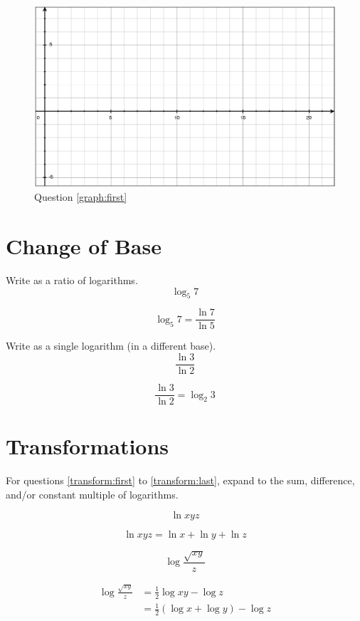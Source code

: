 \documentclass[fleqn,addpoints]{exam}
\begin{document}
\begin{questions}
\begin{solution}[5 cm]
\end{solution}

\ifprintanswers
\else
\begin{figure}[H]
  \centering
  \includegraphics[scale=.6]{graph1.eps}
  \caption*{Question \ref{graph:first}}
\end{figure}
\fi

\pagebreak

\section{Change of Base}
\question[3]
Write as a ratio of logarithms.
\[
  \log_5 7
\]
\begin{solution}[1 cm]
\[
  \log_5 7 = \frac{\ln 7}{\ln 5}
\]
\end{solution}

\question[2]
Write as a single logarithm (in a different base).
\[
  \frac{\ln 3}{\ln 2}
\]
\begin{solution}[1 cm]
\[
  \frac{\ln 3}{\ln 2} = \log_2 3
\]
\end{solution}

\section{Transformations}

For questions \ref{transform:first} to \ref{transform:last}, expand to the sum, difference, and/or constant multiple of
logarithms. 

\question[3]
\label{transform:first}
\[
  \ln xyz
\]
\begin{solution}[3 cm]
\[
  \ln xyz = \ln x + \ln y + \ln z
\]
\end{solution}

\question[7]
\[
  \log \frac{ \sqrt{xy} } { z } 
\]
\begin{solution}[4 cm]
\begin{align*}
  \log \frac{ \sqrt{xy} } { z } &= \frac{1}{2} \log xy - \log z \\
  &= \frac{1}{2} (\log x + \log y) - \log z
\end{align*}


\end{solution}
\end{questions}
\end{document}
